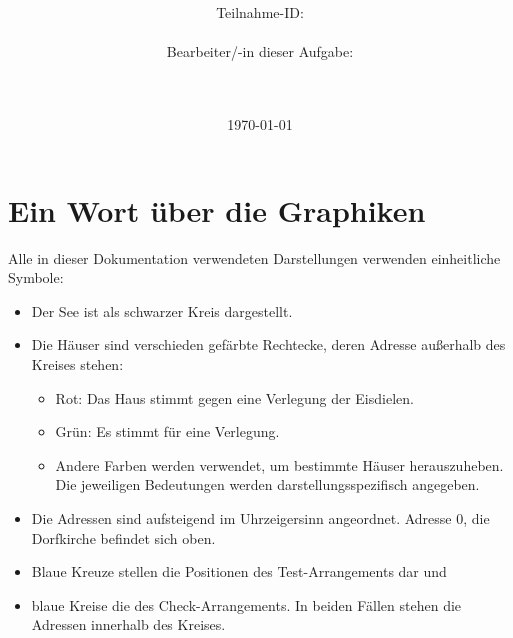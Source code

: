 \documentclass[a4paper,10pt,ngerman]{scrartcl}
\title{\textbf{\Huge\Aufgabe}}
\author{\LARGE Teilnahme-ID: \LARGE \TeilnahmeId \\\\
	    \LARGE Bearbeiter/-in dieser Aufgabe: \\ 
	    \LARGE \Name\\\\}
\date{\LARGE\today}
\begin{document}
\maketitle
\tableofcontents

\vspace{0.5cm}

\section{Ein Wort über die Graphiken}
Alle in dieser Dokumentation verwendeten Darstellungen verwenden einheitliche Symbole:
\begin{itemize}
    \item Der See ist als schwarzer Kreis dargestellt.
    \item Die Häuser sind verschieden gefärbte Rechtecke, deren Adresse außerhalb des Kreises stehen:
          \begin{itemize}
              \item Rot: Das Haus stimmt gegen eine Verlegung der Eisdielen.
              \item Grün: Es stimmt für eine Verlegung.
              \item Andere Farben werden verwendet, um bestimmte Häuser herauszuheben.
                    Die jeweiligen Bedeutungen werden darstellungsspezifisch angegeben.
          \end{itemize}
    \item Die Adressen sind aufsteigend im Uhrzeigersinn angeordnet.
          Adresse $0$, die Dorfkirche befindet sich oben.
    \item Blaue Kreuze stellen die Positionen des Test-Arrangements dar und
    \item blaue Kreise die des Check-Arrangements.
          In beiden Fällen stehen die Adressen innerhalb des Kreises.
\end{itemize}
\end{document}
